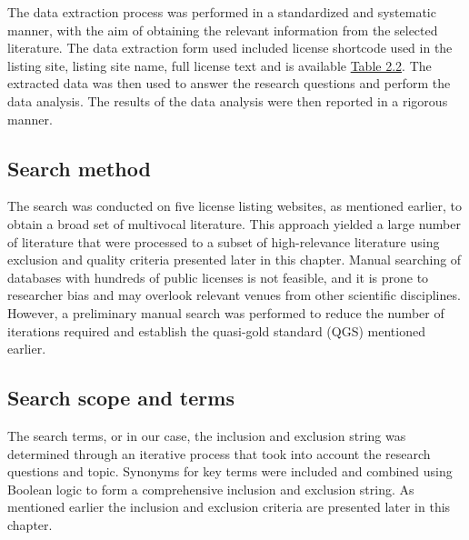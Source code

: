The data extraction process was performed in a standardized and systematic manner, with the aim of obtaining the relevant information from the selected literature. The data extraction form used included license shortcode used in the listing site, listing site name, full license text and is available  \hyperref[table:extraction]{Table 2.2}. The extracted data was then used to answer the research questions and perform the data analysis. The results of the data analysis were then reported in a rigorous manner.

\subsection{Search method}
The search was conducted on five license listing websites, as mentioned earlier, to obtain a broad set of multivocal literature. This approach yielded a large number of literature that were processed to a subset of high-relevance literature using exclusion and quality criteria presented later in this chapter. Manual searching of databases with hundreds of public licenses is not feasible, and it is prone to researcher bias and may overlook relevant venues from other scientific disciplines. However, a preliminary manual search was performed to reduce the number of iterations required and establish the quasi-gold standard (QGS) mentioned earlier.

\subsection{Search scope and terms}
The search terms, or in our case, the inclusion and exclusion string was determined through an iterative process that took into account the research questions and topic. Synonyms for key terms were included and combined using Boolean logic to form a comprehensive inclusion and exclusion string. As mentioned earlier the inclusion and exclusion criteria are presented later in this chapter.

